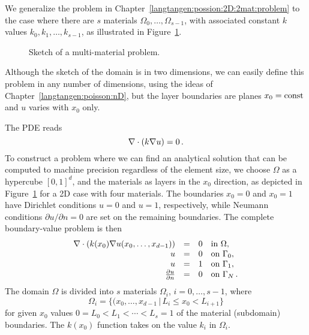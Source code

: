 We generalize the problem in Chapter~\ref{langtangen:possion:2D:2mat:problem}
to the case where there are $s$ materials $\Omega_0,\ldots,\Omega_{s-1}$,
with associated constant $k$ values $k_0,k_1,\ldots,k_{s-1}$,
as illustrated in Figure~\ref{langtangen:possion:nD:nmat:fig1}.
\begin{figure}
\centerline{
  }
  \caption{\label{langtangen:possion:nD:nmat:fig1}
  Sketch of a multi-material problem.
  }
\end{figure}
Although the sketch of the domain is in two dimensions, we can easily
define this problem in any number of dimensions, using
the ideas of Chapter~\ref{langtangen:poisson:nD}, but the layer
boundaries are planes $x_0=\hbox{const}$ and $u$ varies with
$x_0$ only.

The PDE reads
\begin{equation} \label{langtangen:poisson:2D:varcoeff2}
    \nabla\cdot (k\nabla u) =0 \thinspace .
\end{equation}
To construct a problem where we can find an analytical solution that can
be computed to machine precision regardless of the element size,
we choose $\Omega$ as a hypercube $[0,1]^d$, and the materials as
layers in the $x_0$ direction, as depicted in
Figure~\ref{langtangen:possion:nD:nmat:fig1} for a 2D case with four materials.
The boundaries $x_0=0$ and $x_0=1$ have Dirichlet conditions
$u=0$ and $u=1$, respectively, while Neumann conditions
$\partial u/\partial n=0$ are set on the remaining boundaries.
The complete boundary-value problem is then
\begin{equation} \label{langtangen:poisson:2D:varcoeff3}
  \begin{array}{rcll}
    \nabla\cdot \left(k(x_0)\nabla u(x_0,\ldots,x_{d-1})\right)
      &=& 0 &\mbox{in } \Omega, \\
    u &=& 0 &\mbox{on } \Gamma_0,\\
    u &=& 1 &\mbox{on } \Gamma_1,\\
    {\partial u\over\partial n} &=& 0 &\mbox{on } \Gamma_N\thinspace .
  \end{array}
\end{equation}
The domain $\Omega$ is divided into $s$ materials $\Omega_i$, $i=0,\ldots,s-1$,
where
\[ \Omega_i = \{ (x_0,\ldots,x_{d-1}\, |\, L_i \leq x_0 < L_{i+1}\} \]
for given $x_0$ values $0=L_0<L_1<\cdots< L_s=1$ 
of the material (subdomain) boundaries.
The $k(x_0)$ function takes on the value $k_i$ in $\Omega_i$.

